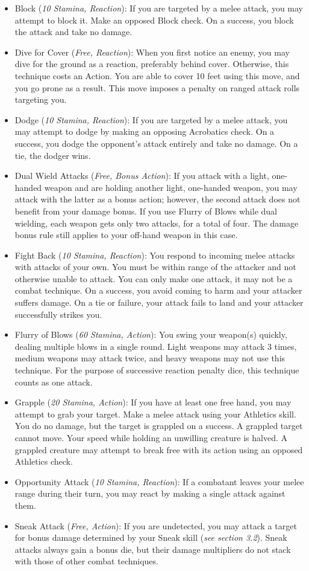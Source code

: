 \begin{itemize}
	\item Block (\textit{10 Stamina, Reaction}): If you are targeted by a melee attack, you may attempt to block it. Make an opposed Block check. On a success, you block the attack and take no damage.
	\item Dive for Cover (\textit{Free, Reaction}): When you first notice an enemy, you may dive for the ground as a reaction, preferably behind cover. Otherwise, this technique costs an Action. You are able to cover 10 feet using this move, and you go prone as a result. This move imposes a penalty on ranged attack rolls targeting you.
	\item Dodge (\textit{10 Stamina, Reaction}): If you are targeted by a melee attack, you may attempt to dodge by making an opposing Acrobatics check. On a success, you dodge the opponent's attack entirely and take no damage. On a tie, the dodger wins.
	\item Dual Wield Attacks (\textit{Free, Bonus Action}): If you attack with a light, one-handed weapon and are holding another light, one-handed weapon, you may attack with the latter as a bonus action; however, the second attack does not benefit from your damage bonus. If you use Flurry of Blows while dual wielding, each weapon gets only two attacks, for a total of four. The damage bonus rule still applies to your off-hand weapon in this case.
	\item Fight Back (\textit{10 Stamina, Reaction}): You respond to incoming melee attacks with attacks of your own. You must be within range of the attacker and not otherwise unable to attack. You can only make one attack, it may not be a combat technique. On a success, you avoid coming to harm and your attacker suffers damage. On a tie or failure, your attack fails to land and your attacker successfully strikes you.
	\item Flurry of Blows (\textit{60 Stamina, Action}): You swing your weapon(s) quickly, dealing multiple blows in a single round. Light weapons may attack 3 times, medium weapons may attack twice, and heavy weapons may not use this technique. For the purpose of successive reaction penalty dice, this technique counts as one attack.
	\item Grapple (\textit{20 Stamina, Action}): If you have at least one free hand, you may attempt to grab your target. Make a melee attack using your Athletics skill. You do no damage, but the target is grappled on a success. A grappled target cannot move. Your speed while holding an unwilling creature is halved. A grappled creature may attempt to break free with its action using an opposed Athletics check.
	\item Opportunity Attack (\textit{10 Stamina, Reaction}): If a combatant leaves your melee range during their turn, you may react by making a single attack against them.
	\item Sneak Attack (\textit{Free, Action}): If you are undetected, you may attack a target for bonus damage determined by your Sneak skill (\textit{see section 3.2}). Sneak attacks always gain a bonus die, but their damage multipliers do not stack with those of other combat techniques.
\end{itemize}

